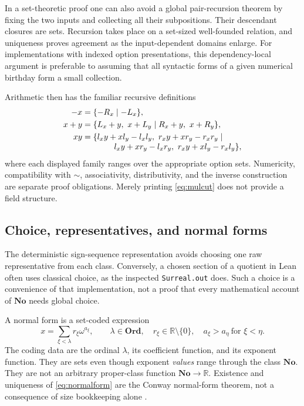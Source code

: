 \documentclass[11pt,letterpaper]{article}
\theoremstyle{definition}
\theoremstyle{remark}
\newcommand{\No}{\mathbf{No}}
\newcommand{\Ord}{\mathbf{Ord}}
\newcommand{\R}{\mathbb R}
\numberwithin{equation}{section}
\begin{document}
In a set-theoretic proof one can also avoid a global pair-recursion theorem by fixing the two inputs and collecting all their subpositions. Their descendant closures are sets. Recursion takes place on a set-sized well-founded relation, and uniqueness proves agreement as the input-dependent domains enlarge. For implementations with indexed option presentations, this dependency-local argument is preferable to assuming that all syntactic forms of a given numerical birthday form a small collection.

Arithmetic then has the familiar recursive definitions
\begin{align}
 -x&=\{-R_x\mid-L_x\},\\
 x+y&=\{L_x+y,\ x+L_y\mid R_x+y,\ x+R_y\},\label{eq:addcut}\\
 xy&=\{l_xy+xl_y-l_xl_y,\ r_xy+xr_y-r_xr_y\mid\nonumber\\[-0.3em]
 &\hspace{3.9em}l_xy+xr_y-l_xr_y,\ r_xy+xl_y-r_xl_y\},\label{eq:mulcut}
\end{align}
where each displayed family ranges over the appropriate option sets. Numericity, compatibility with \(\sim\), associativity, distributivity, and the inverse construction are separate proof obligations. Merely printing \eqref{eq:mulcut} does not provide a field structure.

\subsection{Choice, representatives, and normal forms}
The deterministic sign-sequence representation avoids choosing one raw representative from each class. Conversely, a chosen section of a quotient in Lean often uses classical choice, as the inspected \texttt{Surreal.out} does. Such a choice is a convenience of that implementation, not a proof that every mathematical account of \(\No\) needs global choice.

A normal form is a set-coded expression
\begin{equation}\label{eq:normalform}
 x=\sum_{\xi<\lambda}r_\xi\omega^{a_\xi},\qquad
 \lambda\in\Ord,\quad r_\xi\in\R\setminus\{0\},\quad
 a_\xi>a_\eta\ \text{for }\xi<\eta.
\end{equation}
The coding data are the ordinal \(\lambda\), its coefficient function, and its exponent function. They are sets even though exponent \emph{values} range through the class \(\No\). They are not an arbitrary proper-class function \(\No\to\R\). Existence and uniqueness of \eqref{eq:normalform} are the Conway normal-form theorem, not a consequence of size bookkeeping alone \cite{Conway,Gonshor}.
\end{document}
